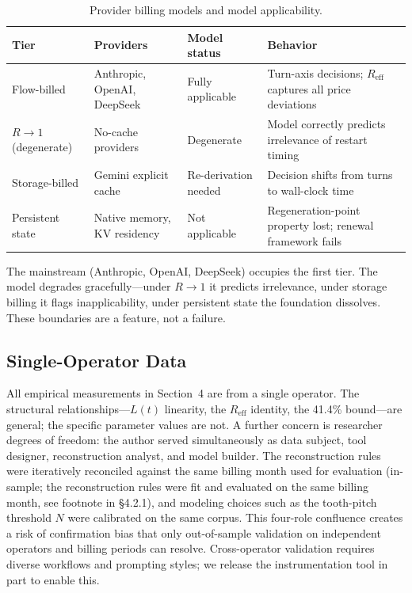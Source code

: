 \documentclass[11pt]{article}
\theoremstyle{definition}
\theoremstyle{remark}
\begin{document}
\begin{table}[ht]
\centering
\caption{Provider billing models and model applicability.}
\label{tab:tiers}
\small
\renewcommand{\arraystretch}{1.15}
\begin{tabular}{@{}p{2.5cm} >{\raggedright\arraybackslash}p{4cm} p{3cm} p{4.5cm}@{}}
\toprule
Tier & Providers & Model status & Behavior \\
\midrule
Flow-billed
& Anthropic, OpenAI, DeepSeek
& Fully applicable
& Turn-axis decisions; $R_{\text{eff}}$ captures all price deviations \\
\addlinespace[2pt]
$R{\to}1$ (degenerate)
& No-cache providers
& Degenerate
& Model correctly predicts irrelevance of restart timing \\
\addlinespace[2pt]
Storage-billed
& Gemini explicit cache
& Re-derivation needed
& Decision shifts from turns to wall-clock time \\
\addlinespace[2pt]
Persistent state
& Native memory, KV residency
& Not applicable
& Regeneration-point property lost; renewal framework fails \\
\bottomrule
\end{tabular}
\end{table}

The mainstream (Anthropic, OpenAI, DeepSeek) occupies the first tier. The model degrades gracefully---under $R{\to}1$ it predicts irrelevance, under storage billing it flags inapplicability, under persistent state the foundation dissolves. These boundaries are a feature, not a failure.

\subsection{Single-Operator Data}

All empirical measurements in Section~4 are from a single operator. The structural relationships---$L(t)$ linearity, the $R_{\text{eff}}$ identity, the 41.4\% bound---are general; the specific parameter values are not. A further concern is researcher degrees of freedom: the author served simultaneously as data subject, tool designer, reconstruction analyst, and model builder. The reconstruction rules were iteratively reconciled against the same billing month used for evaluation (in-sample; the reconstruction rules were fit and evaluated on the same billing month, see footnote in \S4.2.1), and modeling choices such as the tooth-pitch threshold $N$ were calibrated on the same corpus. This four-role confluence creates a risk of confirmation bias that only out-of-sample validation on independent operators and billing periods can resolve. Cross-operator validation requires diverse workflows and prompting styles; we release the instrumentation tool in part to enable this.
\end{document}
